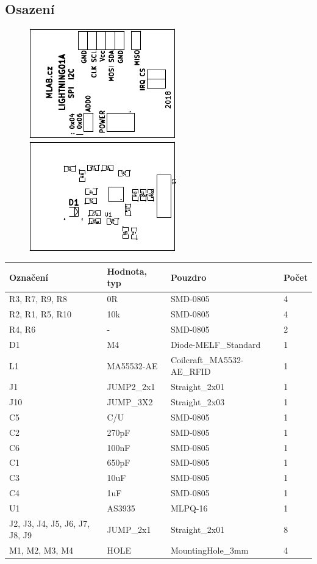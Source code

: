 \subsection{Osazení}


\begin{figure}[ht!]
	\centering
	\includegraphics[scale=2]{../../doc/src/LIGHTNING01A-top_cropped.pdf}
	\qquad
	\includegraphics[scale=2]{../../doc/src/LIGHTNING01A-bottom_cropped.pdf}
\end{figure}

\begin{center}
  \begin{tabular}{ | l | l | l | l |}
    \hline
    Označení & Hodnota, typ & Pouzdro & Počet \\ \hline
    \hline
			R3, R7, R9, R8 & 0R & SMD-0805 & 4\\ \hline
			R2, R1, R5, R10 & 10k & SMD-0805 & 4\\ \hline
			R4, R6 & - & SMD-0805 & 2\\ \hline
			D1 & M4 & Diode-MELF\_Standard & 1\\ \hline
			L1 & MA55532-AE & Coilcraft\_MA5532-AE\_RFID & 1\\ \hline
			J1 & JUMP2\_2x1 & Straight\_2x01 & 1\\ \hline
			J10 & JUMP\_3X2 & Straight\_2x03 & 1\\ \hline
			C5 & C/U & SMD-0805 & 1\\ \hline
			C2 & 270pF & SMD-0805 & 1\\ \hline
			C6 & 100nF & SMD-0805 & 1\\ \hline
			C1 & 650pF & SMD-0805 & 1\\ \hline
			C3 & 10uF & SMD-0805 & 1\\ \hline
			C4 & 1uF & SMD-0805 & 1\\ \hline
			U1 & AS3935 & MLPQ-16 & 1\\ \hline
			J2, J3, J4, J5, J6, J7, J8, J9 & JUMP\_2x1 & Straight\_2x01 & 8\\ \hline
			M1, M2, M3, M4 & HOLE & MountingHole\_3mm & 4\\ \hline
	
  \end{tabular}
\end{center}